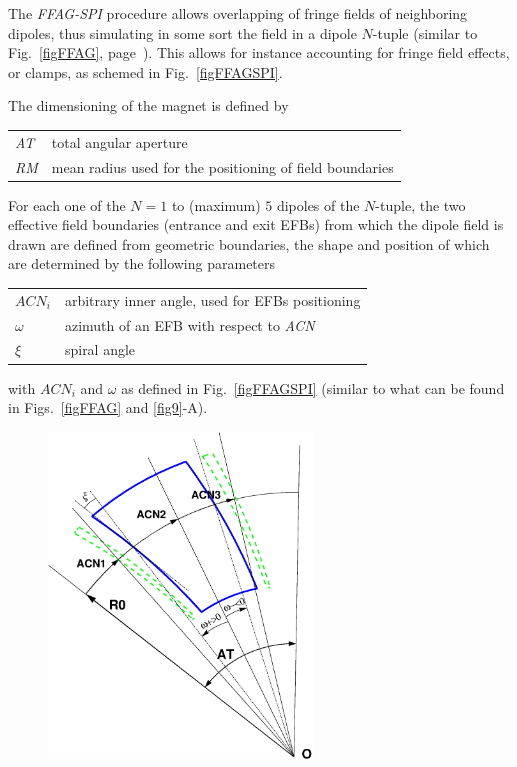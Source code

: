 \medskip

\noindent The \textsl{FFAG-SPI} procedure allows overlapping of fringe fields of neighboring dipoles, 
thus simulating in some sort the field in a dipole $N$-tuple  (similar to Fig.~\ref{figFFAG}, page~\pageref{figFFAG}).
This allows  for instance accounting for fringe field effects, or clamps, as schemed in 
Fig.~\ref{figFFAGSPI}. 

\medskip

\noindent  The dimensioning of the magnet is defined by

\medskip

 \begin{tabular}{>{\sl}l!{~:}l}
	 AT &  total angular aperture \\
	 RM & mean radius used for the positioning of field boundaries\\
 \end{tabular}

\medskip

\noindent For each one of the $N=1$ to (maximum) $5$ dipoles of the  $N$-tuple, 
the two  effective field boundaries (entrance and exit EFBs) from which  the dipole field  is drawn are
defined from geometric boundaries, the shape and position of which are determined by the 
following parameters 

\medskip

\begin{tabular}{l!{~:}l}
	$ACN_i$  & arbitrary inner angle, used for EFBs positioning  \\
	$\omega$ &  azimuth of an EFB with respect to  \textsl{ACN}\\
	$\xi$ & spiral angle \\
\end{tabular}

\medskip

\noindent with $ACN_i$ and $\omega$ as defined in Fig.~\ref{figFFAGSPI} 
(similar to what can be found in Figs.~\ref{figFFAG} and \ref{fig9}-A). 

\begin{figure}[h]
\centerline{\includegraphics[width=7cm]{figFFAGSPI.eps}  }
{\setlength{\captionwidth}{12cm}
 }
\end{figure}


